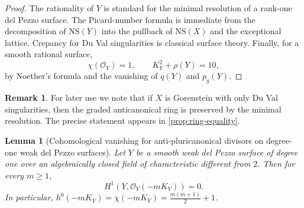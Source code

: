 \documentclass[11pt]{article}
\newtheorem{lemma}[lemma]{Lemma}
\theoremstyle{definition}
\newtheorem{remark}[remark]{Remark}
\newcommand{\NS}{\mathrm{NS}}
\begin{document}
\begin{proof}
The rationality of $Y$ is standard for the minimal resolution of a rank-one del Pezzo surface. The Picard-number formula is immediate from the decomposition of $\NS(Y)$ into the pullback of $\NS(X)$ and the exceptional lattice. Crepancy for Du Val singularities is classical surface theory. Finally, for a smooth rational surface,
\[
\chi(\mathcal O_Y)=1,
\qquad
K_Y^2+\rho(Y)=10,
\]
by Noether's formula and the vanishing of $q(Y)$ and $p_g(Y)$.
\end{proof}

\begin{remark}
For later use we note that if $X$ is Gorenstein with only Du Val singularities, then the graded anticanonical ring is preserved by the minimal resolution. The precise statement appears in \cref{prop:ring-equality}.
\end{remark}

\begin{lemma}[Cohomological vanishing for anti-pluricanonical divisors on degree-one weak del Pezzo surfaces]\label{lem:vanishing}
Let $Y$ be a smooth weak del Pezzo surface of degree one over an algebraically closed field of characteristic different from $2$. Then for every $m\ge 1$,
\[
H^1(Y,\mathcal O_Y(-mK_Y))=0.
\]
In particular, $h^0(-mK_Y)=\chi(-mK_Y)=\frac{m(m+1)}{2}+1$.
\end{lemma}
\end{document}
